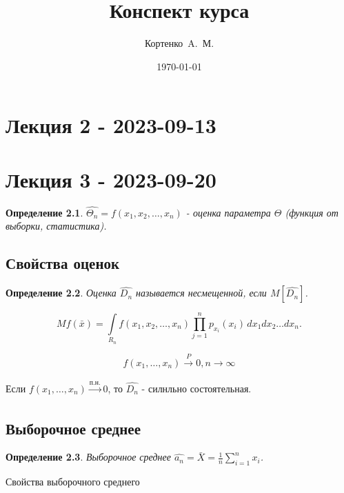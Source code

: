 \documentclass[12pt, oneside]{book}
\author{Кортенко~A.~М.}
\title{Конспект курса}
\date{\today}
\newtheorem{definition}{Определение}[section]
\newcommand{\toP}{\xrightarrow[]{P}} %
\newcommand{\toPN}{\xrightarrow[]{\text{п.н.}}} %
\begin{document}

  

  \chapter{Лекция 2 - 2023-09-13}

  \chapter{Лекция 3 - 2023-09-20}
  
  \begin{definition}
     $\widehat{\Theta_n} = f\left(x_1, x_2,\dots, x_n\right)$ - оценка параметра $\Theta$ (функция от выборки, статистика).
  \end{definition}


  \section{Свойства оценок}
  
  \begin{definition}
    Оценка $\widehat{D_n}$ называется несмещенной, если $M[\widehat{D_n}]$.
  \end{definition}
  
  \[
    M f(\bar{x}) = \int\limits_{R_n} f(x_1, x_2, \dots, x_n) \prod\limits_{j=1}^{n} p_{x_i} (x_i) \, dx_1 dx_2 \dots dx_n.
  \]

  $$f(x_1, \dots, x_n) \toP 0, n \to \infty$$

  Если $f(x_1, \dots, x_n) \toPN 0$, то $\hat{D_n}$ - силнльно состоятельная.


  \section{Выборочное среднее}

  \begin{definition}
    Выборочное среднее $\hat{a_n} = \bar{X} = \frac{1}{n} \sum\limits_{i=1}^{n} x_i$.
  \end{definition}

  Свойства выборочного среднего
\end{document}
